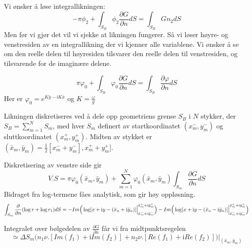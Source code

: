 Vi ønsker å løse integrallikningen:
\begin{equation}\label{eq:144}
    -\pi \phi_2  + \int_{S_B} \phi_2 \frac{\partial G}{\partial n}  dS = \int_{S_B} G n_2 dS
\end{equation}
Men før vi gjør det vil vi sjekke at likningen fungerer. Så vi løser høyre- og venstresiden av en integrallikning der vi kjenner alle variablene. Vi ønsker å se om den reelle delen til høyresiden tilsvarer den reelle delen til venstresiden, og tilsvarende for de imaginære delene. 

\begin{equation}
    \pi \varphi_0  + \int_{S_B} \varphi_0 \frac{\partial G}{\partial n}  dS = \int_{S_B} \frac{\partial \varphi}{\partial n}  dS
\end{equation}
Her er $\varphi_0 = e^{K\bar{y} - \textsf{i}  K \bar{x}}$ og $K = \frac{\omega}{g}$

Likningen diskretiseres ved å dele opp geometriens grense $S_B$ i $N$ stykker, der $S_B = \sum_{m=1}^{N} S_m$, med hver $S_m$ definert av startkoordinatet $(x_{m}^{-} , y_{m}^{-})$ og sluttkoordinatet $(x_{m}^{+} , y_{m}^{+})$. Midten av stykket er $(\bar{x}_{m} , \bar{y}_{m}) = \frac{1}{2}[x_{m}^{-} + y_{m}^{-}], x_{m}^{+} + y_{m}^{+}]$.

Diskretisering av venstre side gir
\begin{equation}
	V.S = \pi \varphi_0( \bar{x}_{m} , \bar{y}_{m}) + \sum_{m=1}^{N} \varphi_0( \bar{x}_{m}, \bar{y}_{m}) \int_{S_m} \frac{\partial G}{\partial n} dS
\end{equation}
Bidraget fra log-termene fåes analytisk, som gir høy oppløsning.
 \begin{equation}
  	\int_{S_m} \frac{\partial}{\partial n}(\log r + \log r_1) dS \\
= -Im\Big( \Big.\log[x + \mathrm{i} y - ( \bar{x}_{n} +\mathrm{i} \bar{y}_{n})]\Big|_{ \bar{x}_{m}^{-} +\mathrm{i} \bar{y}_{m}^{-}}^{ \bar{x}_{m}^{+} +\mathrm{i} \bar{y}_{m}^{+}} \Big) -Im\Big( \Big.\log[x + \mathrm{i} y - ( \bar{x}_{n} -\mathrm{i} \bar{y}_{n})]\Big|_{\bar{x}_{m}^{-} +\mathrm{i} \bar{y}_{m}^{-}}^{\bar{x}_{m}^{+} +\mathrm{i} \bar{y}_{m}^{+}} \Big)
\end{equation}

Integralet over bølgedelen av $\frac{\partial G}{\partial n}$ får vi fra midtpunktsregelen
\begin{equation}
	\simeq \Delta S_m \bigg( n_1 \nu \Big.[ Im(f_1) + \mathrm{i} Im(f_2) ] + n_2 \nu \Big.[ Re(f_1) + \mathrm{i} Re(f_2) ]  \bigg)\Big|_{( \bar{x}_{m} , \bar{y}_{m})}
\end{equation}

